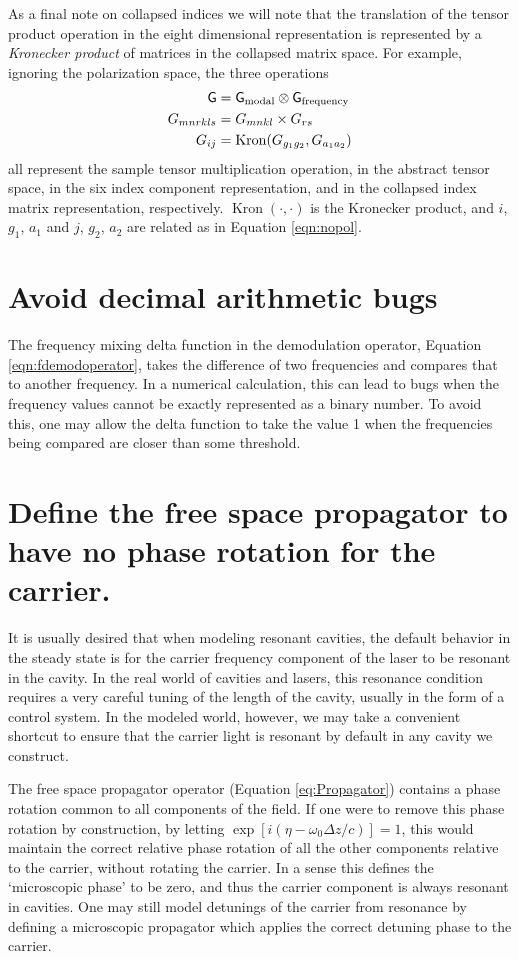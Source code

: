 As a final note on collapsed indices we will note that the translation of the tensor product operation in the eight dimensional representation is represented by a \emph{Kronecker product} of matrices in the collapsed matrix space. %
For example, ignoring the polarization space, the three operations
\begin{align*}
\mathsf{G}&=\mathsf{G}_{\text{modal}}\otimes \mathsf{G}_{\text{frequency}}\\
G_{mnrkls}&=G_{mnkl}\times G_{rs}\\
G_{ij}&=\operatorname{Kron}(G_{g_1g_2},G_{a_1a_2})
\end{align*}
all represent the sample tensor multiplication operation, in the abstract tensor space, in the six index component representation, and in the collapsed index matrix representation, respectively. %
$\operatorname{Kron}(\cdot,\cdot)$ is the Kronecker product, and $i$, $g_1$, $a_1$ and $j$, $g_2$, $a_2$ are related as in Equation \ref{eqn:nopol}.

\section{Avoid decimal arithmetic bugs}
The frequency mixing delta function in the demodulation operator, Equation \ref{eqn:fdemodoperator}, takes the difference of two frequencies and compares that to another frequency. %
In a numerical calculation, this can lead to bugs when the frequency values cannot be exactly represented as a binary number. %
To avoid this, one may allow the delta function to take the value 1 when the frequencies being compared are closer than some threshold.

\section{Define the free space propagator to have no phase rotation for the  carrier.}

It is usually desired that when modeling resonant cavities, the default behavior in the steady state is for the carrier frequency component of the laser to be resonant in the cavity. %
In the real world of cavities and lasers, this resonance condition requires a very careful tuning of the length of the cavity, usually in the form of a control system. %
In the modeled world, however, we may take a convenient shortcut to ensure that the carrier light is resonant by default in any cavity we construct.

The free space propagator operator (Equation \ref{eq:Propagator}) contains a phase rotation common to all components of the field. %
If one were to remove this phase rotation by construction, by letting $\exp[i(\eta - \omega_0 \Delta z/c)]=1$, this would maintain the correct relative phase rotation of all the other components relative to the carrier, without rotating the carrier. %
In a sense this defines the `microscopic phase' to be zero, and thus the  carrier component is always resonant in cavities. %
One may still model detunings of the carrier from resonance by defining a microscopic propagator which applies the correct detuning phase to the carrier.

